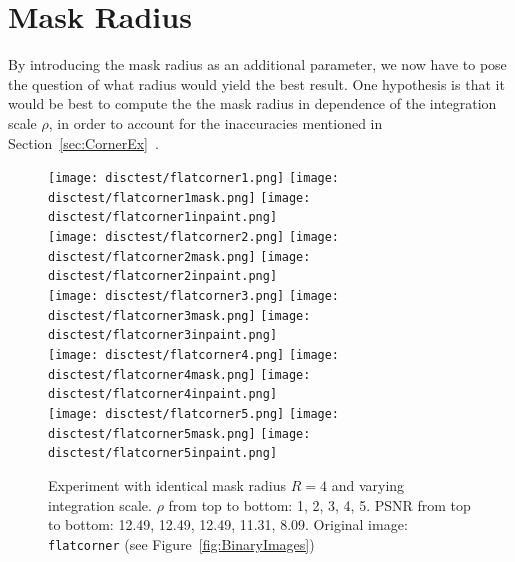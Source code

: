 \section{Mask Radius}\label{sec:MaskEx}
By introducing the mask radius as an additional parameter, we now have to pose the question of what
radius would yield the best result. One hypothesis is that it would be best to compute the the
mask radius in dependence of the integration scale $\rho$, in order to account for the inaccuracies
mentioned in Section~\ref{sec:CornerEx}~\cite{conversation}.
\begin{figure}[h]
    \centering
    \texttt{[image: disctest/flatcorner1.png]}\hspace{0.2cm}
    \texttt{[image: disctest/flatcorner1mask.png]}\hspace{0.2cm}
    \texttt{[image: disctest/flatcorner1inpaint.png]}\\
    \vspace*{0.2cm}
    \texttt{[image: disctest/flatcorner2.png]}\hspace{0.2cm}
    \texttt{[image: disctest/flatcorner2mask.png]}\hspace{0.2cm}
    \texttt{[image: disctest/flatcorner2inpaint.png]}\\
    \vspace*{0.2cm}
    \texttt{[image: disctest/flatcorner3.png]}\hspace{0.2cm}
    \texttt{[image: disctest/flatcorner3mask.png]}\hspace{0.2cm}
    \texttt{[image: disctest/flatcorner3inpaint.png]}\\
    \vspace*{0.2cm}
    \texttt{[image: disctest/flatcorner4.png]}\hspace{0.2cm}
    \texttt{[image: disctest/flatcorner4mask.png]}\hspace{0.2cm}
    \texttt{[image: disctest/flatcorner4inpaint.png]}\\
    \vspace*{0.2cm}
    \texttt{[image: disctest/flatcorner5.png]}\hspace{0.2cm}
    \texttt{[image: disctest/flatcorner5mask.png]}\hspace{0.2cm}
    \texttt{[image: disctest/flatcorner5inpaint.png]}\\
    \caption{Experiment with identical mask radius $R=4$ and varying integration scale. $\rho$ from top to bottom:
    1, 2, 3, 4, 5. PSNR from top to bottom: 12.49, 12.49, 12.49, 11.31, 8.09. Original image:
\texttt{flatcorner} (see Figure~\ref{fig:BinaryImages})}\label{fig:MaskEx}
\end{figure}
